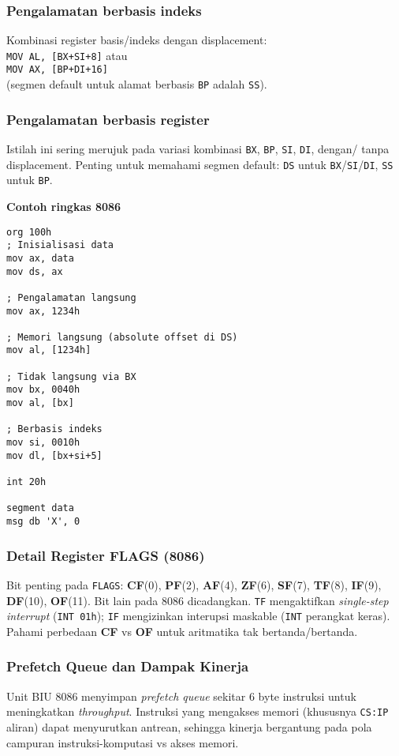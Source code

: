\subsubsection{Pengalamatan berbasis indeks}
Kombinasi register basis/indeks dengan displacement: \\
\texttt{MOV AL, [BX+SI+8]} atau \\
\texttt{MOV AX, [BP+DI+16]} \\
(segmen default untuk alamat berbasis \texttt{BP} adalah \texttt{SS}).

\subsubsection{Pengalamatan berbasis register}
Istilah ini sering merujuk pada variasi kombinasi \texttt{BX}, \texttt{BP}, \texttt{SI}, \texttt{DI}, dengan/ tanpa displacement. Penting untuk memahami segmen default: \texttt{DS} untuk \texttt{BX}/\texttt{SI}/\texttt{DI}, \texttt{SS} untuk \texttt{BP}.

\noindent\textbf{Contoh ringkas 8086}
\begin{verbatim}
org 100h
; Inisialisasi data
mov ax, data
mov ds, ax

; Pengalamatan langsung
mov ax, 1234h

; Memori langsung (absolute offset di DS)
mov al, [1234h]

; Tidak langsung via BX
mov bx, 0040h
mov al, [bx]

; Berbasis indeks
mov si, 0010h
mov dl, [bx+si+5]

int 20h

segment data
msg db 'X', 0
\end{verbatim}
\subsubsection{Detail Register FLAGS (8086)}
Bit penting pada \texttt{FLAGS}: \textbf{CF}(0), \textbf{PF}(2), \textbf{AF}(4), \textbf{ZF}(6), \textbf{SF}(7), \textbf{TF}(8), \textbf{IF}(9), \textbf{DF}(10), \textbf{OF}(11). Bit lain pada 8086 dicadangkan. \texttt{TF} mengaktifkan \textit{single-step interrupt} (\texttt{INT 01h}); \texttt{IF} mengizinkan interupsi maskable (\texttt{INT} perangkat keras). Pahami perbedaan \textbf{CF} vs \textbf{OF} untuk aritmatika tak bertanda/bertanda.

\subsubsection{Prefetch Queue dan Dampak Kinerja}
Unit BIU 8086 menyimpan \textit{prefetch queue} sekitar 6 byte instruksi untuk meningkatkan \textit{throughput}. Instruksi yang mengakses memori (khususnya \texttt{CS:IP} aliran) dapat menyurutkan antrean, sehingga kinerja bergantung pada pola campuran instruksi-komputasi vs akses memori.


